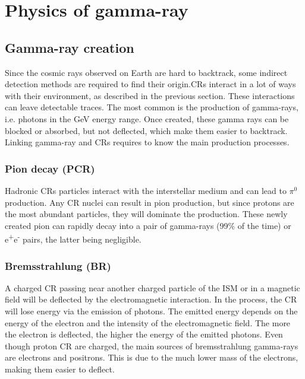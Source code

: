 \section{Physics of gamma-ray}

\subsection{Gamma-ray creation}

Since the cosmic rays observed on Earth are hard to backtrack, some indirect detection methods are required to find their origin.CRs interact in a lot of ways with their environment, as described in the previous section. These interactions can leave detectable traces. The most common is the production of gamma-rays, i.e. photons in the GeV energy range. Once created, these gamma rays can be blocked or absorbed, but not deflected, which make them easier to backtrack. Linking gamma-ray and CRs requires to know the main production processes.

\subsubsection{Pion decay (PCR)}


Hadronic CRs  particles interact with the interstellar medium and can lead to $\pi^0$ production. Any CR nuclei can result in pion production, but since protons are the most abundant particles, they will dominate the production. 
These newly created pion can rapidly decay into a pair of gamma-rays (99\% of the time) or e\textsuperscript{+}e\textsuperscript{-} pairs, the latter being negligible.




\subsubsection{Bremsstrahlung (BR)}


A charged CR passing near another charged particle of the ISM or in a magnetic field will be deflected by the electromagnetic interaction. In the process, the CR will lose energy via the emission of photons. The emitted energy depends on the energy of the electron and the intensity of the electromagnetic field. The more the electron is deflected, the higher the energy of the emitted photons.
Even though proton CR are charged, the main sources of bremsstrahlung gamma-rays are electrons and positrons. This is due to the much lower mass of the electrons, making them easier to deflect. 

